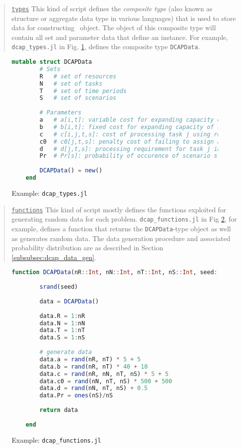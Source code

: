 \begin{quote}
\noindent\underline{\texttt{types}} This kind of script defines the \textit{composite type} (also known as structure or aggregate data type in various languages) that is used to store data for constructing \jumpmodel\ object. The object of this composite type will contain all set and parameter data that define an instance. For example, \texttt{dcap\_types.jl} in Fig. \ref{fig:dcap_types}, defines the composite type \texttt{DCAPData}.
\end{quote}
\begin{figure}[H]
	\centering
	\begin{lstlisting}[frame=single,language=julia]
	mutable struct DCAPData
		# Sets
		R   # set of resources 
		N   # set of tasks 
		T   # set of time periods 
		S   # set of scenarios 
		
		# Parameters
		a   # a[i,t]: variable cost for expanding capacity of resource i at time t
		b   # b[i,t]: fixed cost for expanding capacity of resource i at time t
		c   # c[i,j,t,s]: cost of processing task j using resource i in period t under scenario s
		c0  # c0[j,t,s]: penalty cost of failing to assign a resource to task j under scenario s
		d   # d[j,t,s]: processing requirement for task j in period t under scenario s
		Pr  # Pr[s]: probability of occurence of scenario s
	
		DCAPData() = new()
	end
	\end{lstlisting}
	\caption{Example: \texttt{dcap\_types.jl}}\label{fig:dcap_types}
\end{figure}

\begin{quote}
\noindent\underline{\texttt{functions}} This kind of script mostly defines the functions exploited for generating random data for each problem. \texttt{dcap\_functions.jl} in Fig \ref{fig:dcap_functions}, for example, defines a function that returns the \texttt{DCAPData}-type object as well as generates random data. The data generation procedure and associated probability distribution are as described in Section \ref{subsubsec:dcap_data_gen}.
\end{quote}
\begin{figure}[H]
	\centering
	\begin{lstlisting}[frame=single,language=julia]
	function DCAPData(nR::Int, nN::Int, nT::Int, nS::Int, seed::Int=1)::DCAPData
	
		srand(seed)
		
		data = DCAPData()
		
		data.R = 1:nR
		data.N = 1:nN
		data.T = 1:nT
		data.S = 1:nS
		
		# generate data
		data.a = rand(nR, nT) * 5 + 5
		data.b = rand(nR, nT) * 40 + 10
		data.c = rand(nR, nN, nT, nS) * 5 + 5
		data.c0 = rand(nN, nT, nS) * 500 + 500
		data.d = rand(nN, nT, nS) + 0.5
		data.Pr = ones(nS)/nS
		
		return data
		
	end
	\end{lstlisting}
	\caption{Example: \texttt{dcap\_functions.jl}}\label{fig:dcap_functions}
\end{figure}

